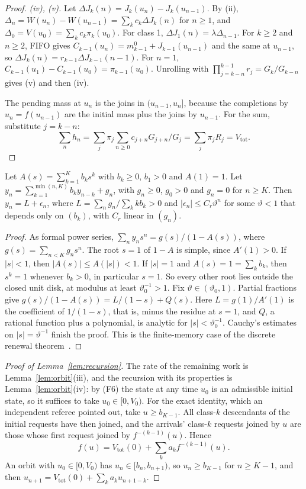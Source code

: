 \begin{proof}
\emph{(iv), (v).} Let $\Delta J_k(n)=J_k(u_n)-J_k(u_{n-1})$. By (ii), $\Delta_n=W(u_n)-W(u_{n-1})=\sum_kc_k\Delta J_k(n)$ for
$n\ge1$, and $\Delta_0=V(u_0)=\sum_kc_k\pi_k(u_0)$. For class 1, $\Delta J_1(n)=\lambda\Delta_{n-1}$. For $k\ge2$ and
$n\ge2$, FIFO gives $C_{k-1}(u_n)=m^0_{k-1}+J_{k-1}(u_{n-1})$ and the same at $u_{n-1}$, so
$\Delta J_k(n)=r_{k-1}\Delta J_{k-1}(n-1)$. For $n=1$, $C_{k-1}(u_1)-C_{k-1}(u_0)=\pi_{k-1}(u_0)$. Unrolling with
$\prod_{j=k-n}^{k-1}r_j=G_k/G_{k-n}$ gives (v) and then (iv).

The pending mass at $u_n$ is the joins in $(u_{n-1},u_n]$, because the completions by $u_n=f(u_{n-1})$ are the initial mass
plus the joins by $u_{n-1}$. For the sum, substitute $j=k-n$:
\[
\sum_nh_n=\sum_j\pi_j\sum_{n\ge0}c_{j+n}G_{j+n}/G_j=\sum_j\pi_jR_j=V_{\mathrm{tot}}.
\]
\end{proof}

\begin{lemma}\label{lem:renewal}
Let $A(s)=\sum_{k=1}^Kb_ks^k$ with $b_k\ge0$, $b_1>0$ and $A(1)=1$. Let
$y_n=\sum_{k=1}^{\min(n,K)}b_ky_{n-k}+g_n$, with $g_n\ge0$, $g_0>0$ and $g_n=0$ for $n\ge K$. Then $y_n=L+\epsilon_n$, where
$L=\sum_ng_n/\sum_kkb_k>0$ and $|\epsilon_n|\le C_r\vartheta^n$ for some $\vartheta<1$ that depends only on $(b_k)$, with
$C_r$ linear in $(g_n)$.
\end{lemma}

\begin{proof}
As formal power series, $\sum_ny_ns^n=g(s)/(1-A(s))$, where $g(s)=\sum_{n<K}g_ns^n$. The root $s=1$ of $1-A$ is simple, since
$A'(1)>0$. If $|s|<1$, then $|A(s)|\le A(|s|)<1$. If $|s|=1$ and $A(s)=1=\sum_kb_k$, then $s^k=1$ whenever $b_k>0$, in
particular $s=1$. So every other root lies outside the closed unit disk, at modulus at least $\vartheta_0^{-1}>1$. Fix
$\vartheta\in(\vartheta_0,1)$. Partial fractions give $g(s)/(1-A(s))=L/(1-s)+Q(s)$. Here $L=g(1)/A'(1)$ is the coefficient
of $1/(1-s)$, that is, minus the residue at $s=1$, and $Q$, a rational function plus a polynomial, is analytic for
$|s|<\vartheta_0^{-1}$. Cauchy's estimates on $|s|=\vartheta^{-1}$ finish the proof. This is the finite-memory case of the
discrete renewal theorem~\citep[Ch.~XIII]{feller1968introduction}.
\end{proof}

\begin{proof}[Proof of Lemma~\ref{lem:recursion}]
The rate of the remaining work is Lemma~\ref{lem:orbit}(iii), and the recursion with its properties is Lemma~\ref{lem:orbit}(iv):
by (F6) the state at any time $u_0$ is an admissible initial state, so it suffices to take $u_0\in[0,V_0)$.
For the exact identity, which an independent referee pointed out, take $u\ge b_{K-1}$. All class-$k$ descendants of the initial
requests have then joined, and the arrivals' class-$k$ requests joined by $u$ are those whose first request joined by
$f^{-(k-1)}(u)$. Hence
\[
f(u)=V_{\mathrm{tot}}(0)+\sum_ka_kf^{-(k-1)}(u).
\]
An orbit with $u_0\in[0,V_0)$ has $u_n\in[b_n,b_{n+1})$, so $u_n\ge b_{K-1}$ for $n\ge K-1$, and then
$u_{n+1}=V_{\mathrm{tot}}(0)+\sum_ka_ku_{n+1-k}$.
\end{proof}

